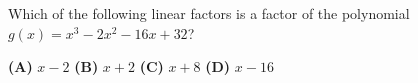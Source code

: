 Which of the following linear factors is a factor of the polynomial $g(x)=x^3-2x^2-16x+32$?

\textbf{(A)} $x-2$ \qquad \textbf{(B)} $x+2$ \qquad \textbf{(C)} $x+8$ \qquad \textbf{(D)} $x-16$
